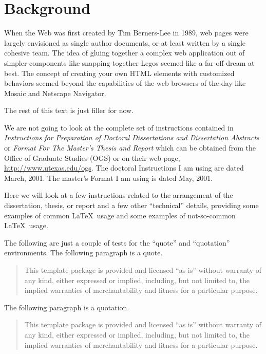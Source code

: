 \chapter{Background}
%

When the Web was first created by Tim Berners-Lee in 1989, web pages were largely envisioned as single author documents, or at least written by a single cohesive team. 
The idea of gluing together a complex web application out of simpler components like snapping together Legos seemed like a far-off dream at best.
The concept of creating your own HTML elements with customized behaviors seemed beyond the capabilities of the web browsers of the day like Mosaic and Netscape Navigator.

The rest of this text is just filler for now.

We are not going to look at the complete set of instructions contained
in \emph{Instructions for Preparation of Doctoral Dissertations and
Dissertation Abstracts} or \emph{Format For The Master's Thesis and Report}
which can be obtained from the Office of Graduate Studies (OGS)
%
or on their web page,
%
\url{http://www.utexas.edu/ogs}.
The doctoral Instructions I am using are dated March, 2001.
The master's Format I am using is dated May, 2001.

Here we will look at a few instructions related to the arrangement of the
dissertation, thesis, or report and a few other ``technical'' details,
providing some examples of common \LaTeX\ usage and some examples of
not-so-common \LaTeX\ usage.

The following are just a couple of tests for the ``quote''
and ``quotation'' environments. The following paragraph is a quote.
\begin{quote}
%
This template package is provided and licensed
``as is'' without warranty of any kind, either expressed or
implied, including, but not limited to, the implied warranties
of merchantability and fitness for a particular purpose.
\end{quote}
The following paragraph is a quotation.
\begin{quotation}
%
This template package is provided and licensed
``as is'' without warranty of any kind, either expressed or
implied, including, but not limited to, the implied warranties
of merchantability and fitness for a particular purpose.
\end{quotation}

